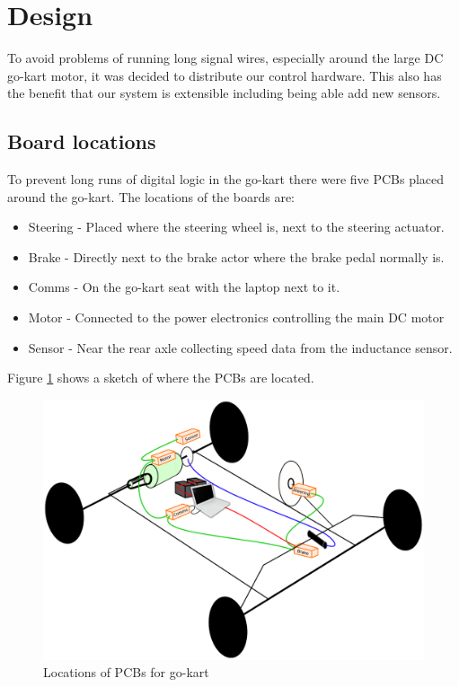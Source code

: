 \section{Design}
  To avoid problems of running long signal wires, especially around the large
  DC go-kart motor, it was decided to distribute our control hardware. This
  also has the benefit that our system is extensible including being able add
  new sensors.

  \subsection{Board locations}
  To prevent long runs of digital logic in the go-kart there were five PCBs
  placed around the go-kart. The locations of the boards are:
  \begin{itemize}
  \item Steering - Placed where the steering wheel is, next to the steering
  actuator.
  \item Brake - Directly next to the brake actor where the brake pedal normally
  is.
  \item Comms - On the go-kart seat with the laptop next to it.
  \item Motor - Connected to the power electronics controlling the main DC motor
  \item Sensor - Near the rear axle collecting speed data from the inductance
  sensor.
  \end{itemize}
  Figure \ref{locations} shows a sketch of where the PCBs are located.

  \begin{figure}[h]
    \centering
    \includegraphics[width=\linewidth]{Images/layout}
    \caption{Locations of PCBs for go-kart}
    \label{locations}
  \end{figure}


